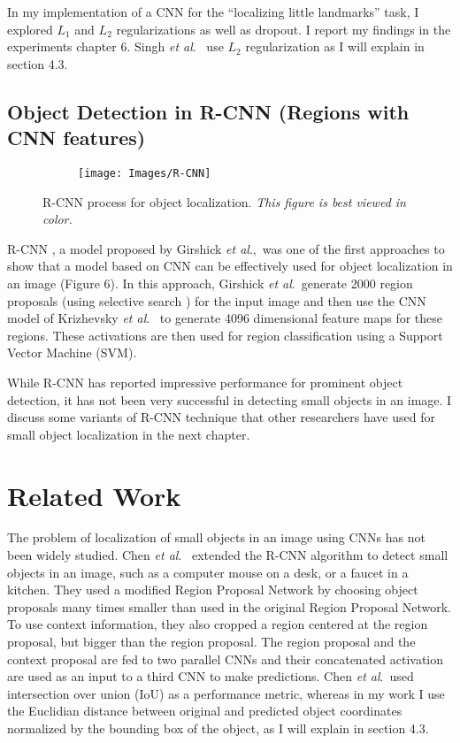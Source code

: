 \documentclass [11pt,letterpaper ,openany ]{report}
\begin{document}
    In my implementation of a CNN for the ``localizing little landmarks'' task, I explored \(L_1\) and \(L_2\) regularizations as well as dropout. I report my findings in the experiments chapter 6. Singh \textit{et al}.\ \cite{Singh_2016_CVPR} use \(L_2\) regularization as I will explain in section 4.3.

     \section{Object Detection in R-CNN (Regions with CNN features)}

    \begin{figure}[h]
      \centering
      \begin{subfigure}[b]{0.70\linewidth}
        \texttt{[image: Images/R-CNN]}
      \end{subfigure}
      \caption{R-CNN \cite{girshick2014rich} process for object localization. \textit{This figure is best viewed in color.}}
      \label{fig:r-cnn}
    \end{figure}    

     R-CNN \cite{girshick2014rich}, a model proposed by Girshick \textit{et al}.,\ was one of the first approaches to show that a model based on CNN can be effectively used for object localization in an image (Figure 6). In this approach, Girshick \textit{et al}.\ generate 2000 region proposals (using selective search \cite{uijlings2013selective}) for the input image and then use the CNN model of Krizhevsky \textit{et al}.\ \cite{krizhevsky2012imagenet} to generate 4096 dimensional feature maps for these regions. These activations are then used for region classification using a Support Vector Machine (SVM).

     While R-CNN has reported impressive performance for prominent object detection, it has not been very successful in detecting small objects in an image. I discuss some variants of R-CNN technique that other researchers have used for small object localization \cite{chen2016r, eggert2017improving} in the next chapter.

    \chapter{Related Work}
    \doublespacing
    The problem of localization of small objects in an image using CNNs has not been widely studied. Chen \textit{et al}.\ \cite{chen2016r} extended the R-CNN algorithm to detect small objects in an image, such as a computer mouse on a desk, or a faucet in a kitchen. They used a modified Region Proposal Network \cite{ren2015faster} by choosing object proposals many times smaller than used in the original Region Proposal Network. To use context information, they also cropped a region centered at the region proposal, but bigger than the region proposal. The region proposal and the context proposal are fed to two parallel CNNs and their concatenated activation are used as an input to a third CNN to make predictions. Chen \textit{et al}.\ used intersection over union (IoU) as a performance metric, whereas in my work I use the Euclidian distance between original and predicted object coordinates normalized by the bounding box of the object, as I will explain in section 4.3. 
\end{document}
